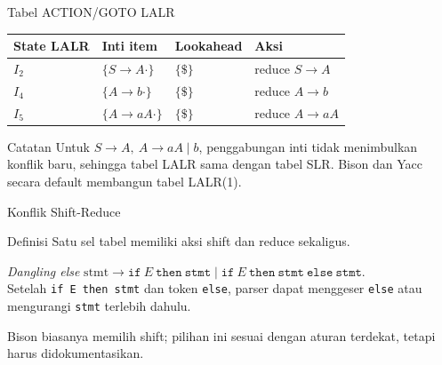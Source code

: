\documentclass[aspectratio=169,10pt,t]{beamer}
\begin{document}
\begin{frame}{Tabel ACTION/GOTO LALR}
  \small
  \setlength{\tabcolsep}{4pt}
  \begin{tabular}{@{}p{1.8cm}p{3.6cm}p{2.6cm}p{5.2cm}@{}}
    \toprule
    \textbf{State LALR} & \textbf{Inti item} & \textbf{Lookahead} &
      \textbf{Aksi} \\
    \midrule
    \(I_2\) & \(\{S \to A \cdot\}\) & \(\{\$\}\) &
      reduce \(S \to A\) \\
    \(I_4\) & \(\{A \to b \cdot\}\) & \(\{\$\}\) &
      reduce \(A \to b\) \\
    \(I_5\) & \(\{A \to aA \cdot\}\) & \(\{\$\}\) &
      reduce \(A \to aA\) \\
    \bottomrule
  \end{tabular}

  \vspace{5pt}
  \begin{block}{Catatan}
    \footnotesize
    Untuk \(S \to A,\ A \to aA \mid b\), penggabungan inti tidak
    menimbulkan konflik baru, sehingga tabel LALR sama dengan tabel
    SLR. Bison dan Yacc secara default membangun tabel LALR(1).
  \end{block}
\end{frame}

\begin{frame}{Konflik Shift-Reduce}
  \begin{block}{Definisi}
    \small
    Satu sel tabel memiliki aksi shift dan reduce sekaligus.
  \end{block}

  \begin{exampleblock}{\textit{Dangling else}}
    \footnotesize
    \(\text{stmt} \to \texttt{if}\ E\ \texttt{then}\ \texttt{stmt}
     \mid \texttt{if}\ E\ \texttt{then}\ \texttt{stmt}\
     \texttt{else}\ \texttt{stmt}\).\\
    Setelah \texttt{if E then stmt} dan token \texttt{else}, parser
    dapat menggeser \texttt{else} atau mengurangi \texttt{stmt}
    terlebih dahulu.
  \end{exampleblock}

  \vspace{2pt}
  {\footnotesize Bison biasanya memilih shift; pilihan ini sesuai
  dengan aturan \eng{else} terdekat, tetapi harus didokumentasikan.}
\end{frame}
\end{document}
